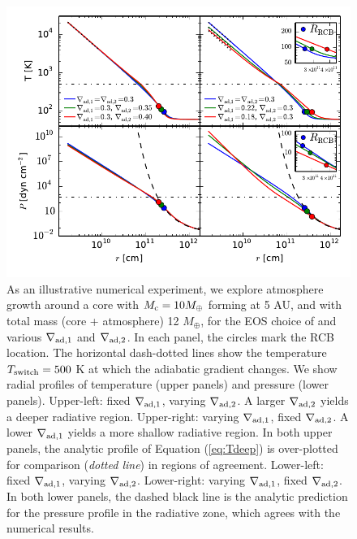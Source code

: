 \begin{figure}[tb]
\centering
\includegraphics[width=\textwidth]{figures/varying_delad_4panel_3.pdf}
\caption{As an illustrative numerical experiment, we explore atmosphere growth around a core with $M_{\rm c}=10 M_{\oplus}$ forming at 5 AU, and with total mass (core + atmosphere) 12 $M_{\oplus}$, for the EOS choice of  and various $\nabla_{\rm ad,1}$ and $\nabla_{\rm ad,2}$. In each panel, the circles mark the RCB location. The horizontal dash-dotted lines show the temperature $T_{\rm switch}=500$ K at which the adiabatic gradient changes. We show radial profiles of temperature (upper panels) and pressure (lower panels). Upper-left: fixed $\nabla_{\rm ad,1}$, varying  $\nabla_{\rm ad,2}$. A larger $\nabla_{\rm ad,2}$ yields a deeper radiative region. Upper-right: varying $\nabla_{\rm ad,1}$, fixed $\nabla_{\rm ad,2}$. A lower $\nabla_{\rm ad,1}$ yields a more shallow radiative region. In both upper panels, the analytic profile of Equation (\ref{eq:Tdeep}) is over-plotted for comparison (\textit{dotted line}) in regions of agreement. Lower-left: fixed $\nabla_{\rm ad,1}$, varying  $\nabla_{\rm ad,2}$. Lower-right: varying $\nabla_{\rm ad,1}$, fixed $\nabla_{\rm ad,2}$. In both lower panels, the dashed black line is the analytic prediction for the pressure profile in the radiative zone, which agrees with the numerical results.}
\label{fig:varying_delad}
\end{figure}



